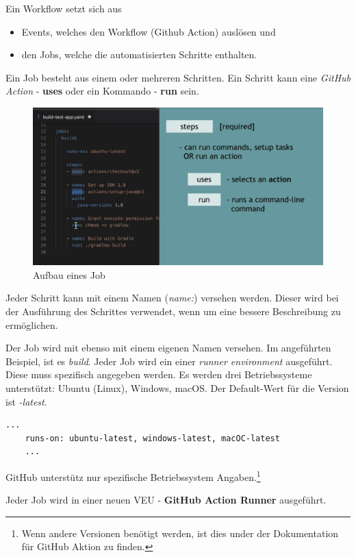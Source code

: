 Ein Workflow setzt sich aus
\begin{itemize}
	\item Events, welches den Workflow (Github Action) auslösen und
	\item den Jobs, welche die automatisierten Schritte enthalten.
\end{itemize}
Ein Job besteht aus einem oder mehreren Schritten. Ein Schritt kann eine \textit{GitHub Action} - \textbf{uses} oder ein Kommando - \textbf{run} sein.

\begin{figure}[H]
	\centering
	\includegraphics[scale = 0.2]{attachment/chapter_2/Scc100}
	\caption{Aufbau eines Job}
\end{figure}

Jeder Schritt kann mit einem Namen (\textit{name:}) versehen werden. Dieser wird bei der Ausführung des Schrittes verwendet, wenn um eine bessere Beschreibung zu ermöglichen.

Der Job wird mit ebenso mit einem eigenen Namen versehen. Im angeführten Beispiel, ist es \textit{build}. Jeder Job wird ein einer \textit{runner environment} ausgeführt. Diese muss spezifisch angegeben werden. Es werden drei Betriebssysteme unterstützt: Ubuntu (Linux), Windows, macOS. Der Default-Wert für die Version ist \textit{-latest}.

\begin{lstlisting}[style=Config, caption={GitHub Runner}, captionpos=b]
	...
	runs-on: ubuntu-latest, windows-latest, macOC-latest
	...
\end{lstlisting}

GitHub unterstütz nur spezifische Betriebssystem Angaben.\footnote{
	Wenn andere Versionen benötigt werden, ist dies under der Dokumentation für GitHub Aktion zu finden.
}	

Jeder Job wird in einer neuen \gls{VEU} - \textbf{GitHub Action Runner} ausgeführt.

